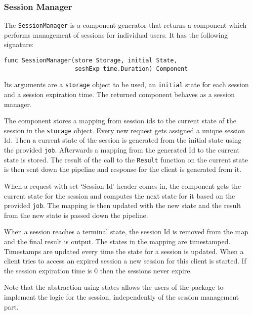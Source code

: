 \subsubsection{Session Manager}
The \texttt{SessionManager} is a component generator that returns a component
which performs management of sessions for individual users. It has the following signature:
\begin{lstlisting}
func SessionManager(store Storage, initial State, 
                    seshExp time.Duration) Component
\end{lstlisting}
Its arguments are a \texttt{storage} object to be used, an \texttt{initial} 
state for each session and a session expiration time.
The returned component behaves as a session manager. 

The component stores a mapping from session ids to the current state of the session
in the \texttt{storage} object.
Every new request gets assigned a unique session Id. Then a current state
of the session is generated from the initial state using the provided
\texttt{job}. Afterwards a mapping from the generated Id to the current state
is stored. The result of the call to the \texttt{Result} function on the
current state is then sent down the pipeline and response for the client 
is generated from it.

When a request with set `Session-Id' header comes in, the component gets the current 
state for the session and computes the next state for it based on the provided 
\texttt{job}.
The mapping is then updated with the new state and the result from the new state
is passed down the pipeline.

When a session reaches a terminal state, the session Id is removed from the map
and the final result is output.
The states in the mapping are timestamped. Timestamps are updated every time
the state for a session is updated. When a client tries to access an expired
session a new session for this client is started. If the session expiration
time is 0 then the sessions never expire.

Note that the abstraction using states allows the users of the 
package to implement the logic for the session, independently of 
the session management part.


